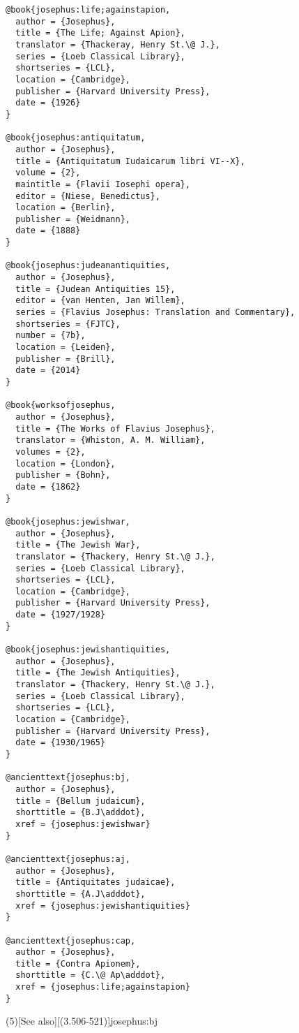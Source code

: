 \documentclass[a4paper]{article}
\renewcommand\footnote[1]{##1}%
\begin{document}
\begin{verbatim}
@book{josephus:life;againstapion,
  author = {Josephus},
  title = {The Life; Against Apion},
  translator = {Thackeray, Henry St.\@ J.},
  series = {Loeb Classical Library},
  shortseries = {LCL},
  location = {Cambridge},
  publisher = {Harvard University Press},
  date = {1926}
}

@book{josephus:antiquitatum,
  author = {Josephus},
  title = {Antiquitatum Iudaicarum libri VI--X},
  volume = {2},
  maintitle = {Flavii Iosephi opera},
  editor = {Niese, Benedictus},
  location = {Berlin},
  publisher = {Weidmann},
  date = {1888}
}

@book{josephus:judeanantiquities,
  author = {Josephus},
  title = {Judean Antiquities 15},
  editor = {van Henten, Jan Willem},
  series = {Flavius Josephus: Translation and Commentary},
  shortseries = {FJTC},
  number = {7b},
  location = {Leiden},
  publisher = {Brill},
  date = {2014}
}

@book{worksofjosephus,
  author = {Josephus},
  title = {The Works of Flavius Josephus},
  translator = {Whiston, A. M. William},
  volumes = {2},
  location = {London},
  publisher = {Bohn},
  date = {1862}
}

@book{josephus:jewishwar,
  author = {Josephus},
  title = {The Jewish War},
  translator = {Thackery, Henry St.\@ J.},
  series = {Loeb Classical Library},
  shortseries = {LCL},
  location = {Cambridge},
  publisher = {Harvard University Press},
  date = {1927/1928}
}

@book{josephus:jewishantiquities,
  author = {Josephus},
  title = {The Jewish Antiquities},
  translator = {Thackery, Henry St.\@ J.},
  series = {Loeb Classical Library},
  shortseries = {LCL},
  location = {Cambridge},
  publisher = {Harvard University Press},
  date = {1930/1965}
}

@ancienttext{josephus:bj,
  author = {Josephus},
  title = {Bellum judaicum},
  shorttitle = {B.J\adddot},
  xref = {josephus:jewishwar}
}

@ancienttext{josephus:aj,
  author = {Josephus},
  title = {Antiquitates judaicae},
  shorttitle = {A.J\adddot},
  xref = {josephus:jewishantiquities}
}

@ancienttext{josephus:cap,
  author = {Josephus},
  title = {Contra Apionem},
  shorttitle = {C.\@ Ap\adddot},
  xref = {josephus:life;againstapion}
}
\end{verbatim}

\examplecite[atrans](5)[See also][(3.506-521)]{josephus:bj}
\begin{verbcite}
  \nocite{josephus:antiquitatum, josephus:judeanantiquities, worksofjosephus}
\end{verbcite}
\exampleancientsources
\examplesecondarysources
\examplebibliography
{}
\end{document}
